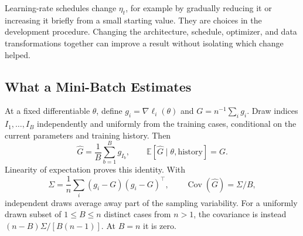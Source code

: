 \par\addvspace{\intextsep}\noindent\begin{minipage}{\linewidth}
\centering
{}
\label{fig:learning-rate-cases}
\end{minipage}\par\addvspace{\intextsep}

Learning-rate schedules change $\eta_t$, for example by gradually reducing it or increasing it briefly from a small starting value. They are choices in the development procedure. Changing the architecture, schedule, optimizer, and data transformations together can improve a result without isolating which change helped.

\subsection{What a Mini-Batch Estimates}

At a fixed differentiable $\theta$, define $g_i=\nabla\ell_i(\theta)$ and $G=n^{-1}\sum_i g_i$. Draw indices $I_1,\ldots,I_B$ independently and uniformly from the training cases, conditional on the current parameters and training history. Then
\[
\hat G=\frac1B\sum_{b=1}^{B}g_{I_b},
\qquad\mathbb E[\hat G\mid\theta,\text{history}]=G.
\]
Linearity of expectation proves this identity. With
\[
\Sigma=\frac1n\sum_i(g_i-G)(g_i-G)^\top,
\qquad \operatorname{Cov}(\hat G)=\Sigma/B,
\]
independent draws average away part of the sampling variability. For a uniformly drawn subset of $1\leq B\leq n$ distinct cases from $n>1$, the covariance is instead $(n-B)\Sigma/[B(n-1)]$. At $B=n$ it is zero.

